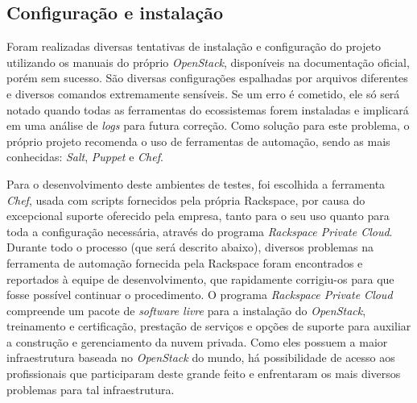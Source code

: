 \subsection{Configuração e instalação}

Foram realizadas diversas tentativas de instalação e configuração do projeto
utilizando os manuais do próprio \emph{OpenStack}, disponíveis na documentação
oficial, porém sem sucesso. São diversas configurações espalhadas por arquivos
diferentes e diversos comandos extremamente sensíveis. Se um erro é cometido,
ele só será notado quando todas as ferramentas do ecossistemas forem instaladas
e implicará em uma análise de \emph{logs} para futura correção. Como solução
para este problema, o próprio projeto recomenda o uso de ferramentas de automação,
sendo as mais conhecidas: \emph{Salt}, \emph{Puppet} e \emph{Chef}.

Para o desenvolvimento deste ambientes de testes, foi escolhida a ferramenta
\emph{Chef}, usada com scripts fornecidos pela própria Rackspace, por causa
do excepcional suporte oferecido pela empresa, tanto para o seu uso quanto para
toda a configuração necessária, através do programa \emph{Rackspace Private Cloud}.
Durante todo o processo (que será descrito abaixo), diversos problemas na ferramenta de automação
fornecida pela Rackspace foram encontrados e reportados à equipe de desenvolvimento,
que rapidamente corrigiu-os para que fosse possível continuar o procedimento.
O programa \emph{Rackspace Private Cloud} compreende um pacote de \emph{software livre} para a instalação do
\emph{OpenStack}, treinamento e certificação, prestação de serviços e opções
de suporte para auxiliar a construção e gerenciamento da nuvem privada. Como
eles possuem a maior infraestrutura baseada no \emph{OpenStack} do mundo, há possibilidade
de acesso aos profissionais que participaram deste grande feito e enfrentaram os
mais diversos problemas para tal infraestrutura.

